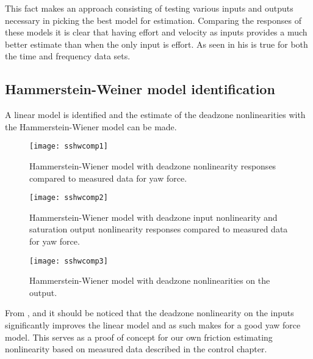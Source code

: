 {This fact makes an approach consisting of testing various inputs and outputs  necessary in picking the best model for estimation.
Comparing the responses of these models it is clear that having effort and velocity as inputs provides a much better estimate than when the only input is effort.
As seen in  his is true for both the time and frequency data sets.

\newpage
\subsection{Hammerstein-Weiner model identification}\label{hammerWeinmodeid}

A linear model is identified and the estimate of the deadzone nonlinearities with the Hammerstein-Wiener model can be made.


\begin{figure}[H]
\centering
\hspace{-2.5em}\texttt{[image: sshwcomp1]}
\caption{Hammerstein-Wiener model with deadzone nonlinearity responses compared to measured data for yaw force.}
\label{fig:2LMI}
\end{figure}

\begin{figure}[H]
\centering
\hspace{-2.5em}\texttt{[image: sshwcomp2]}
\caption{Hammerstein-Wiener model with deadzone input nonlinearity and saturation output nonlinearity responses compared to measured data for yaw force.}
\label{fig:2LMI1}
\end{figure}

\begin{figure}[H]
\centering
\hspace{-2.5em}\texttt{[image: sshwcomp3]}
\caption{Hammerstein-Wiener model with deadzone nonlinearities on the output.}
\label{fig:2LMI2}
\end{figure}

From ,  and  it should be noticed that the deadzone nonlinearity on the inputs significantly improves the linear model and as such makes for a good yaw force model.
This serves as a proof of concept for our own friction estimating nonlinearity based on measured data described in the control chapter.

}
